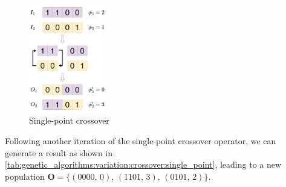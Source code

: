   \begin{figure}[ht!]
    \centering
    \includegraphics[width=0.3\textwidth]{img/theoretical_framework/Single-Point Crossover.png}
    \caption{Single-point crossover}
    \label{fig:genetic_algorithms:variation:crossover:single_point}
  \end{figure}

  Following another iteration of the single-point crossover operator, we can generate a result as 
  shown in \vref{tab:genetic_algorithms:variation:crossover:single_point}, leading to a new 
  population \(\textbf{O} = \{(0000,\, 0),\, (1101,\, 3),\, (0101,\, 2)\}\).

